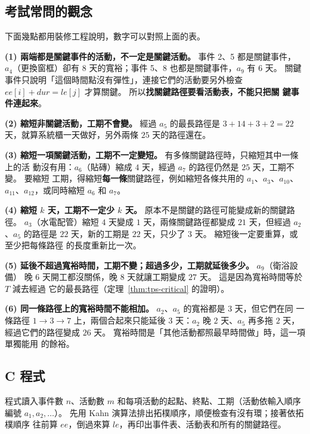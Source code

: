 \subsection{考試常問的觀念}

下面幾點都用裝修工程說明，數字可以對照上面的表。

\textbf{(1) 兩端都是關鍵事件的活動，不一定是關鍵活動。} 事件 2、5 都是關鍵事件，
$a_4$（更換窗框）卻有 $8$ 天的寬裕；事件 5、8 也都是關鍵事件，$a_9$ 有 $6$ 天。 關鍵
事件只說明「這個時間點沒有彈性」，連接它們的活動要另外檢查 $\mathit{ee}[i] +
\mathit{dur} = \mathit{le}[j]$ 才算關鍵。 所以\textbf{找關鍵路徑要看活動表，不能只把關
鍵事件連起來}。

\textbf{(2) 縮短非關鍵活動，工期不會變。} 經過 $a_5$ 的最長路徑是 $3 + 14 + 3 + 2 = 22$
天，就算系統櫃一天做好，另外兩條 $25$ 天的路徑還在。

\textbf{(3) 縮短一項關鍵活動，工期不一定變短。} 有多條關鍵路徑時，只縮短其中一條上的活
動沒有用：$a_6$（貼磚）縮成 $4$ 天，經過 $a_7$ 的路徑仍然是 $25$ 天，工期不變。 要縮短
工期，得縮短\textbf{每一條}關鍵路徑，例如縮短各條共用的 $a_1$、$a_3$、$a_{10}$、
$a_{11}$、$a_{12}$，或同時縮短 $a_6$ 和 $a_7$。

\textbf{(4) 縮短 $k$ 天，工期不一定少 $k$ 天。} 原本不是關鍵的路徑可能變成新的關鍵路徑。
$a_3$（水電配管）縮短 $4$ 天變成 $1$ 天，兩條關鍵路徑都變成 $21$ 天，但經過 $a_2$、$a_5$
的路徑是 $22$ 天，新的工期是 $22$ 天，只少了 $3$ 天。 縮短後一定要重算，或至少把每條路徑
的長度重新比一次。

\textbf{(5) 延後不超過寬裕時間，工期不變；超過多少，工期就延後多少。} $a_9$（衛浴設備）
晚 $6$ 天開工都沒關係，晚 $8$ 天就讓工期變成 $27$ 天。 這是因為寬裕時間等於 $T$ 減去經過
它的最長路徑（定理~\ref{thm:tps-critical} 的證明）。

\textbf{(6) 同一條路徑上的寬裕時間不能相加。} $a_2$、$a_5$ 的寬裕都是 $3$ 天，但它們在同
一條路徑 $1 \to 3 \to 7$ 上，兩個合起來只能延後 $3$ 天：$a_2$ 晚 $2$ 天、$a_5$ 再多拖 $2$
天，經過它們的路徑變成 $26$ 天。 寬裕時間是「其他活動都照最早時間做」時，這一項單獨能用
的餘裕。

\subsection{C 程式}

程式讀入事件數 $n$、活動數 $m$ 和每項活動的起點、終點、工期（活動依輸入順序編號
$a_1, a_2, \ldots$）。 先用 Kahn 演算法排出拓樸順序，順便檢查有沒有環；接著依拓樸順序
往前算 $\mathit{ee}$，倒過來算 $\mathit{le}$，再印出事件表、活動表和所有的關鍵路徑。

